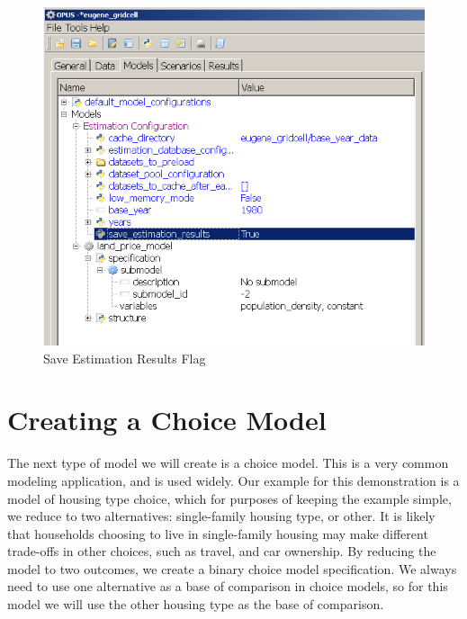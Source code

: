 \begin{figure}[htp]
\begin{center}
\includegraphics[scale=0.6]{part-gui/images/model-manager-save-estimation.png}
\end{center}
\caption{Save Estimation Results Flag}
\label{fig:save-estimation}
\end{figure}


\section{Creating a Choice Model}
The next type of model we will create is a choice model.  This is a very common modeling application, and is used widely.  Our example for this demonstration is a model of housing type choice, which for purposes of keeping the example simple, we reduce to two alternatives: single-family housing type, or other.  It is likely that households choosing to live in single-family housing may make different trade-offs in other choices, such as travel, and car ownership.  By reducing the model to two outcomes, we create a binary choice model specification.  We always need to use one alternative as a base of comparison in choice models, so for this model we will use the other housing type as the base of comparison.  

